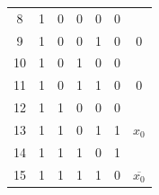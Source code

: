 \documentclass[a4paper,12pt]{article}
\begin{document}
\begin{table}[H]
\begin{tabular}{|c|c|c|c|c|c|c|}
            8                          & 1                         & 0                         & 0                         & 0                         & 0                         &                                    \\ \cline{1-6}
            9                          & 1                         & 0                         & 0                         & 1                         & 0                         & \multirow{-2}{*}{0}                \\ \hline
            10                         & 1                         & 0                         & 1                         & 0                         & 0                         &                                    \\ \cline{1-6}
            11                         & 1                         & 0                         & 1                         & 1                         & 0                         & \multirow{-2}{*}{0}                \\ \hline
            12                         & 1                         & 1                         & 0                         & 0                         & 0                         &                                    \\ \cline{1-6}
            \cellcolor[HTML]{32CB00}13 & \cellcolor[HTML]{32CB00}1 & \cellcolor[HTML]{32CB00}1 & \cellcolor[HTML]{32CB00}0 & \cellcolor[HTML]{32CB00}1 & \cellcolor[HTML]{32CB00}1 & \multirow{-2}{*}{$x_0$}            \\ \hline
            \cellcolor[HTML]{32CB00}14 & \cellcolor[HTML]{32CB00}1 & \cellcolor[HTML]{32CB00}1 & \cellcolor[HTML]{32CB00}1 & \cellcolor[HTML]{32CB00}0 & \cellcolor[HTML]{32CB00}1 &                                    \\ \cline{1-6}
            15                         & 1                         & 1                         & 1                         & 1                         & 0                         & \multirow{-2}{*}{$\overline{x_0}$} \\ \hline
            \end{tabular}
        \end{table}
\end{document}
